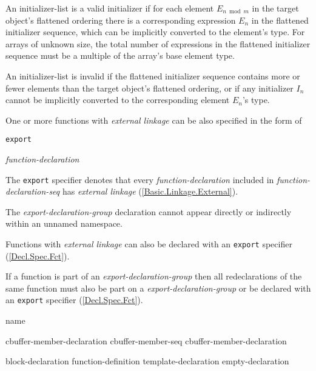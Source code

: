 \p An initializer-list is a valid initializer if for each element
\(E_{n \bmod m}\) in the target object's flattened ordering there is a
corresponding expression \(E_n\) in the flattened initializer sequence, which
can be implicitly converted to the element's type. For arrays of unknown size,
the total number of expressions in the flattened initializer sequence must be a
multiple of the array's base element type.

\p An initializer-list is invalid if the flattened initializer sequence contains
more or fewer elements than the target object's flattened ordering, or if any
initializer \(I_n\) cannot be implicitly converted to the corresponding element
\(E_n\)'s type.



\p One or more functions with \textit{external linkage} can be also specified in the form of

\begin{grammar}
  \br
  \texttt{export} \terminal{\{}  \terminal{\}}\br

  \br
  \textit{function-declaration} 
\end{grammar}

\p The \texttt{export} specifier denotes that every \textit{function-declaration} included in \textit{function-declaration-seq} has \textit{external linkage} (\ref{Basic.Linkage.External}).

\p The \textit{export-declaration-group} declaration cannot appear directly or indirectly within an unnamed namespace.

\p Functions with \textit{external linkage} can also be declared with an \texttt{export} specifier (\ref{Decl.Spec.Fct}).

\p If a function is part of an \textit{export-declaration-group} then all redeclarations of the same function must also be part on a \textit{export-declaration-group} or be declared with an \texttt{export} specifier (\ref{Decl.Spec.Fct}).


\begin{grammar}
  \br
   name  \terminal{\{}
     \terminal {\}}\br

  \br
  cbuffer-member-declaration\br
  cbuffer-member-seq cbuffer-member-declaration\br

  \br
  block-declaration\br
  function-definition\br
  template-declaration\br
  empty-declaration
\end{grammar}

